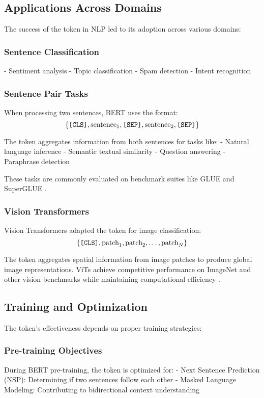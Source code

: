 \subsection{Applications Across Domains}

The success of the \cls{} token in NLP led to its adoption across various domains:

\subsubsection{Sentence Classification}
- Sentiment analysis
- Topic classification  
- Spam detection
- Intent recognition

\subsubsection{Sentence Pair Tasks}
When processing two sentences, BERT uses the format:
$$\{\texttt{[CLS]}{}, \text{sentence}_1, \texttt{[SEP]}{}, \text{sentence}_2, \texttt{[SEP]}{}\}$$

The \cls{} token aggregates information from both sentences for tasks like:
- Natural language inference
- Semantic textual similarity  
- Question answering
- Paraphrase detection

These tasks are commonly evaluated on benchmark suites like GLUE \citep{wang2018glue} and SuperGLUE \citep{wang2019superglue}.

\subsubsection{Vision Transformers}
Vision Transformers \citep{dosovitskiy2020image} adapted the \cls{} token for image classification:
$$\{\texttt{[CLS]}{}, \text{patch}_1, \text{patch}_2, \ldots, \text{patch}_N\}$$

The \cls{} token aggregates spatial information from image patches to produce global image representations. ViTs achieve competitive performance on ImageNet \citep{russakovsky2015imagenet, deng2009imagenet} and other vision benchmarks while maintaining computational efficiency \citep{strubell2019energy}.

\subsection{Training and Optimization}

The \cls{} token's effectiveness depends on proper training strategies:

\subsubsection{Pre-training Objectives}
During BERT pre-training, the \cls{} token is optimized for:
- Next Sentence Prediction (NSP): Determining if two sentences follow each other
- Masked Language Modeling: Contributing to bidirectional context understanding

